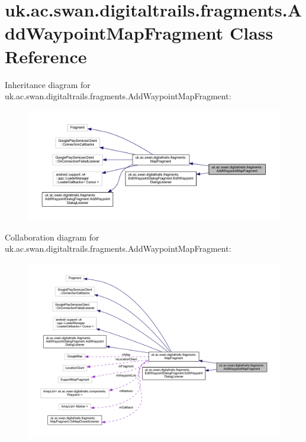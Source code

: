 \hypertarget{classuk_1_1ac_1_1swan_1_1digitaltrails_1_1fragments_1_1_add_waypoint_map_fragment}{\section{uk.\+ac.\+swan.\+digitaltrails.\+fragments.\+Add\+Waypoint\+Map\+Fragment Class Reference}
\label{classuk_1_1ac_1_1swan_1_1digitaltrails_1_1fragments_1_1_add_waypoint_map_fragment}
}


Inheritance diagram for uk.\+ac.\+swan.\+digitaltrails.\+fragments.\+Add\+Waypoint\+Map\+Fragment\+:\nopagebreak
\begin{figure}[H]
\begin{center}
\leavevmode
\includegraphics[width=350pt]{classuk_1_1ac_1_1swan_1_1digitaltrails_1_1fragments_1_1_add_waypoint_map_fragment__inherit__graph}
\end{center}
\end{figure}


Collaboration diagram for uk.\+ac.\+swan.\+digitaltrails.\+fragments.\+Add\+Waypoint\+Map\+Fragment\+:\nopagebreak
\begin{figure}[H]
\begin{center}
\leavevmode
\includegraphics[width=350pt]{classuk_1_1ac_1_1swan_1_1digitaltrails_1_1fragments_1_1_add_waypoint_map_fragment__coll__graph}
\end{center}
\end{figure}
